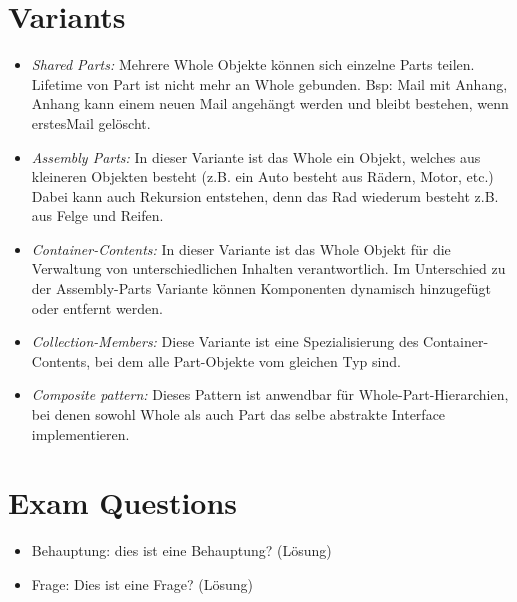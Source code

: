 \section{Variants}
\begin{itemize}
	\item \textit{Shared Parts:} Mehrere Whole Objekte können sich einzelne Parts teilen. Lifetime von Part ist nicht mehr an Whole gebunden. Bsp: Mail mit Anhang, Anhang kann einem neuen Mail angehängt werden und bleibt bestehen, wenn erstesMail gelöscht.
	\item \textit{Assembly Parts:} In dieser Variante ist das Whole ein Objekt, welches aus kleineren Objekten besteht (z.B. ein Auto besteht aus Rädern, Motor, etc.) Dabei kann auch Rekursion entstehen, denn das Rad wiederum besteht z.B. aus Felge und Reifen.
	\item \textit{Container-Contents:} In dieser Variante ist das Whole Objekt für die Verwaltung von unterschiedlichen Inhalten verantwortlich. Im Unterschied zu der Assembly-Parts Variante können Komponenten dynamisch hinzugefügt oder entfernt werden.
	\item \textit{Collection-Members:} Diese Variante ist eine Spezialisierung des Container-Contents, bei dem alle Part-Objekte vom gleichen Typ sind.
	\item \textit{Composite pattern:} Dieses Pattern ist anwendbar für Whole-Part-Hierarchien, bei denen sowohl Whole als auch Part das selbe abstrakte Interface implementieren.
\end{itemize}

\section{Exam Questions}
\begin{itemize}
  	\item Behauptung: dies ist eine Behauptung? (Lösung)
    \item Frage: Dies ist eine Frage? (Lösung)
\end{itemize}
